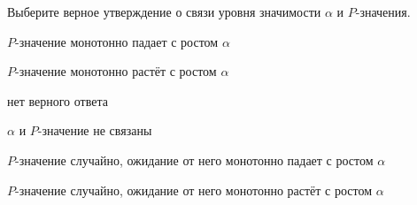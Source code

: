 
\begin{question}
Выберите верное утверждение о связи уровня значимости \(\alpha\) и
\(P\)-значения.
\begin{answerlist}
  \item \(P\)-значение монотонно падает с ростом \(\alpha\)
  \item \(P\)-значение монотонно растёт с ростом \(\alpha\)
  \item нет верного ответа
  \item \(\alpha\) и \(P\)-значение не связаны
  \item \(P\)-значение случайно, ожидание от него монотонно падает с ростом
\(\alpha\)
  \item \(P\)-значение случайно, ожидание от него монотонно растёт с ростом
\(\alpha\)
\end{answerlist}
\end{question}


